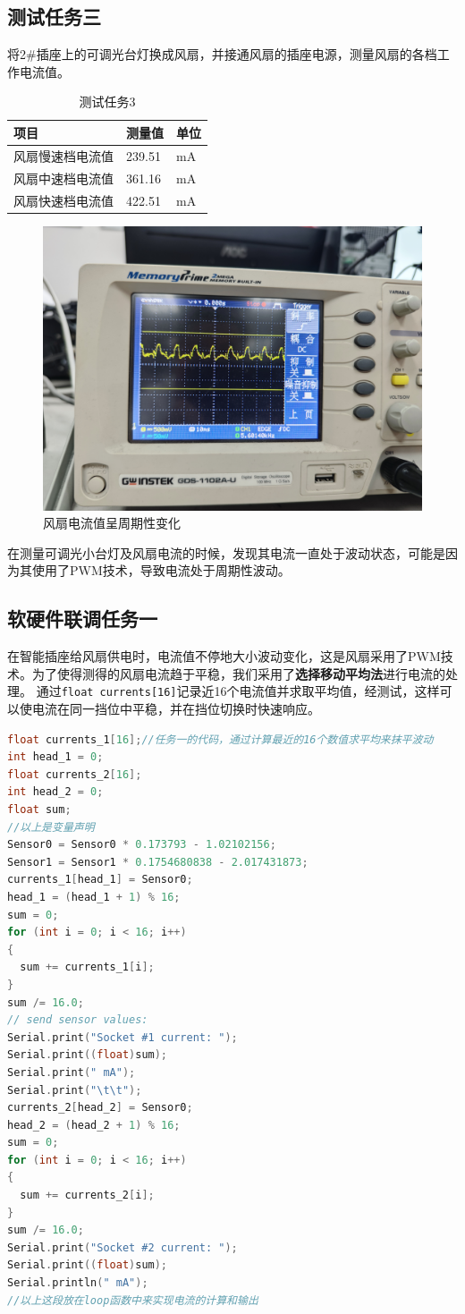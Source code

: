 \subsection{测试任务三}
将2\#插座上的可调光台灯换成风扇，并接通风扇的插座电源，测量风扇的各档工作电流值。
\begin{table}[H]
\centering
\caption{测试任务3}
\begin{tabular}{L{.3\textwidth}C{.3\textwidth}L{.1\textwidth}}
  \toprule
  项目  & 测量值  & 单位\\
  \midrule
  风扇慢速档电流值 &  239.51  & mA\\
  风扇中速档电流值 &  361.16  & mA\\
  风扇快速档电流值 &  422.51  & mA\\
  \bottomrule
\end{tabular}
\end{table}
\begin{figure}[H]
  \centering
  \includegraphics[width=.7\textwidth]{./figures/插座/PWM.jpg}
  \caption{风扇电流值呈周期性变化}
\end{figure}
在测量可调光小台灯及风扇电流的时候，发现其电流一直处于波动状态，可能是因为其使用了PWM技术，导致电流处于周期性波动。
\subsection{软硬件联调任务一}
在智能插座给风扇供电时，电流值不停地大小波动变化，这是风扇采用了PWM技术。为了使得测得的风扇电流趋于平稳，我们采用了\textbf{选择移动平均法}进行电流的处理。
通过\verb|float currents[16]|记录近16个电流值并求取平均值，经测试，这样可以使电流在同一挡位中平稳，并在挡位切换时快速响应。
\begin{lstlisting}[language=C++, caption={任务一}, captionpos=b]
float currents_1[16];//任务一的代码，通过计算最近的16个数值求平均来抹平波动
int head_1 = 0;
float currents_2[16];
int head_2 = 0;
float sum;
//以上是变量声明
Sensor0 = Sensor0 * 0.173793 - 1.02102156;
Sensor1 = Sensor1 * 0.1754680838 - 2.017431873;
currents_1[head_1] = Sensor0;
head_1 = (head_1 + 1) % 16;
sum = 0;
for (int i = 0; i < 16; i++)
{
  sum += currents_1[i];
}
sum /= 16.0;
// send sensor values:
Serial.print("Socket #1 current: ");
Serial.print((float)sum);
Serial.print(" mA");
Serial.print("\t\t");
currents_2[head_2] = Sensor0;
head_2 = (head_2 + 1) % 16;
sum = 0;
for (int i = 0; i < 16; i++)
{
  sum += currents_2[i];
}
sum /= 16.0;
Serial.print("Socket #2 current: ");
Serial.print((float)sum);
Serial.println(" mA");
//以上这段放在loop函数中来实现电流的计算和输出
\end{lstlisting}
